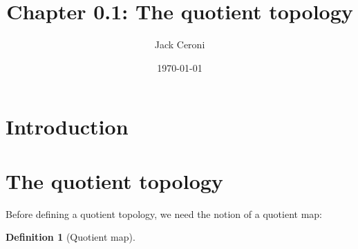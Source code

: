 \documentclass[10pt, oneside]{amsart}
\title{Chapter 0.1: The quotient topology}
\author{Jack Ceroni}
\date{\today}
\newtheorem{definition}{Definition}
\theoremstyle{definition}
\begin{document}
\maketitle

\tableofcontents

\section{Introduction}

\section{The quotient topology}

\noindent Before defining a quotient topology, we need the notion of a quotient map:

\begin{definition}[Quotient map]

  \end{definition}

\vspace{20pt}
    
\end{document}
